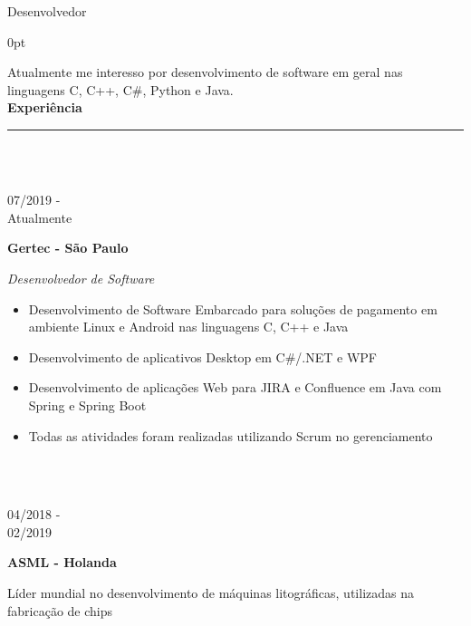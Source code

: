 \documentclass[a4paper]{article}
\begin{document}
\LARGE Desenvolvedor
\vspace{12.5pt}
\begin{adjustwidth}{\parindent}{0pt}
\begin{minipage}[t]{0.65\textwidth}
\large Atualmente me interesso por desenvolvimento de software em geral nas linguagens C, C++, C\#, Python e Java.\\

\Large{\textbf{Experiência}} \normalsize \\ \rule{\textwidth}{0.5pt} \\ \\

\begin{minipage}[t]{0.2\textwidth}
\large{07/2019 - \\ Atualmente}
\end{minipage}
\begin{minipage}[t]{0.8\textwidth}
{
  \setlength{\parskip}{5.5pt}
  \Large{\textbf{Gertec - São Paulo}}

  \large{\textit{Desenvolvedor de Software}}
  \begin{itemize}
    \item \normalsize{Desenvolvimento de Software Embarcado para soluções de pagamento em ambiente Linux e Android nas linguagens C, C++ e Java}
    \item \normalsize{Desenvolvimento de aplicativos Desktop em C\#/.NET e WPF}
    \item \normalsize{Desenvolvimento de aplicações Web para JIRA e Confluence em Java com Spring e Spring Boot}
    \item \normalsize{Todas as atividades foram realizadas utilizando Scrum no gerenciamento}
  \end{itemize}
}
\end{minipage} \\ \\

\begin{minipage}[t]{0.2\textwidth}
\large{04/2018 - \\ 02/2019}
\end{minipage}
\begin{minipage}[t]{0.8\textwidth}
{
  \setlength{\parskip}{5.5pt}
  \Large{\textbf{ASML - Holanda}}
  
  \large{Líder mundial no desenvolvimento de máquinas litográficas, utilizadas na fabricação de chips}
  
}
\end{minipage}
\end{minipage}
\end{adjustwidth}
\end{document}
